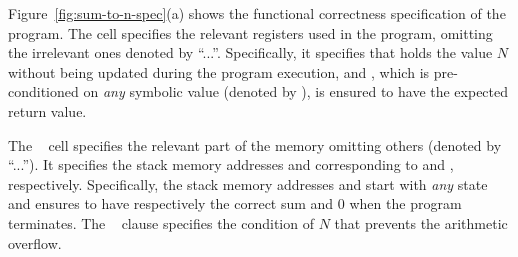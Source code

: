 Figure~\ref{fig:sum-to-n-spec}(a) shows the functional correctness specification of the  program.
The  cell specifies the relevant registers used in the program, omitting the irrelevant ones denoted by ``...''.
Specifically, it specifies that  holds the value $N$ without being 
updated during the program execution, and 
, which is pre-conditioned on \emph{any} symbolic value (denoted by 
), is ensured to have the expected return value.

The ~ cell specifies the relevant part of the memory omitting 
others (denoted by ``...'').
It specifies the stack memory addresses  and  
corresponding to  and , respectively. Specifically, the stack memory 
addresses  and  start with \emph{any} state  and 
ensures to have respectively the correct sum and $0$ when the program 
terminates. 
The ~ clause specifies the condition of $N$ that prevents the 
arithmetic overflow.
%
